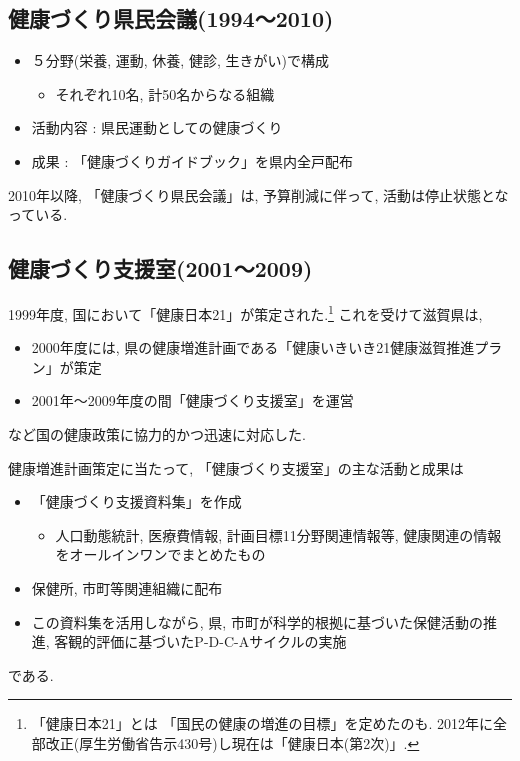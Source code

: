 \subsection{健康づくり県民会議(1994〜2010)}
\begin{itemize} \setlength{\itemsep}{-0.5mm} \setlength{\parskip}{-0.5mm}
	\item ５分野(栄養, 運動, 休養, 健診, 生きがい)で構成
	      \begin{itemize} \setlength{\itemsep}{-0.5mm} \setlength{\parskip}{-0.5mm}
		      \item それぞれ10名, 計50名からなる組織
	      \end{itemize}
	\item 活動内容 : 県民運動としての健康づくり
	\item 成果 : 「健康づくりガイドブック」を県内全戸配布
\end{itemize}
2010年以降, 「健康づくり県民会議」は, 予算削減に伴って, 活動は停止状態となっている.

\subsection{健康づくり支援室(2001〜2009)}
1999年度, 国において「健康日本21」が策定された.\footnote{「健康日本21」とは
	「国民の健康の増進の目標」を定めたのも. 2012年に全部改正(厚生労働省告示430号)し現在は「健康日本(第2次)」.}
これを受けて滋賀県は,
\begin{itemize} \setlength{\itemsep}{-0.5mm} \setlength{\parskip}{-0.5mm}
	\item 2000年度には, 県の健康増進計画である「健康いきいき21健康滋賀推進プラン」が策定
	\item 2001年〜2009年度の間「健康づくり支援室」を運営
\end{itemize}
など国の健康政策に協力的かつ迅速に対応した.

健康増進計画策定に当たって, 「健康づくり支援室」の主な活動と成果は
\begin{itemize} \setlength{\itemsep}{-0.5mm} \setlength{\parskip}{-0.5mm}
	\item 「健康づくり支援資料集」を作成
	      \begin{itemize} \setlength{\itemsep}{-0.5mm} \setlength{\parskip}{-0.5mm}
		      \item 人口動態統計, 医療費情報, 計画目標11分野関連情報等, 健康関連の情報をオールインワンでまとめたもの
	      \end{itemize}
	\item 保健所, 市町等関連組織に配布
	\item この資料集を活用しながら, 県, 市町が科学的根拠に基づいた保健活動の推進, 客観的評価に基づいたP-D-C-Aサイクルの実施
\end{itemize}
である.

